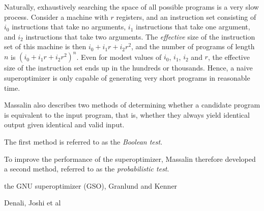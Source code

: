 \documentclass[a4paper,11pt]{kth-mag}
\begin{document}
Naturally, exhaustively searching the space of all possible programs is a very slow process.
Consider a machine with $r$ registers, and an instruction set consisting of $i_0$ instructions that take no arguments, $i_1$ instructions that take one argument, and $i_2$ instructions that take two arguments.
The \emph{effective} size of the instruction set of this machine is then $i_0+i_1r+i_2r^2$, and the number of programs of length $n$ is $(i_0+i_1r+i_2r^2)^n$.
Even for modest values of $i_0$, $i_1$, $i_2$ and $r$, the effective size of the instruction set ends up in the hundreds or thousands.
Hence, a naive superoptimizer is only capable of generating very short programs in reasonable time.


Massalin also describes two methods of determining whether a candidate program is equivalent to the input program, that is, whether they always yield identical output given identical and valid input.

The first method is referred to as the \emph{Boolean test}.

To improve the performance of the superoptimizer, Massalin therefore developed a second method, referred to as the \emph{probabilistic test}.

the GNU superoptimizer (GSO), Granlund and Kenner \cite{granlund92}

Denali, Joshi et al \cite{joshi02}
\end{document}
